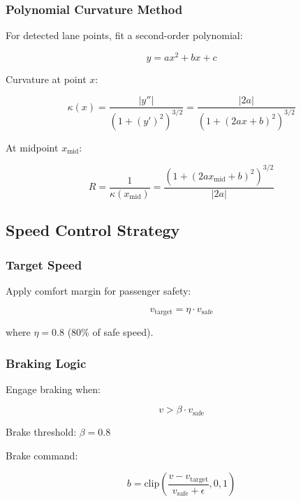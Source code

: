 \documentclass[11pt,a4paper]{article}
\begin{document}
\subsubsection{Polynomial Curvature Method}

For detected lane points, fit a second-order polynomial:

\begin{equation}
y = ax^2 + bx + c
\end{equation}

Curvature at point $x$:

\begin{equation}
\kappa(x) = \frac{|y''|}{(1 + (y')^2)^{3/2}} = \frac{|2a|}{(1 + (2ax + b)^2)^{3/2}}
\end{equation}

At midpoint $x_{\text{mid}}$:

\begin{equation}
R = \frac{1}{\kappa(x_{\text{mid}})} = \frac{(1 + (2ax_{\text{mid}} + b)^2)^{3/2}}{|2a|}
\end{equation}

\subsection{Speed Control Strategy}

\subsubsection{Target Speed}

Apply comfort margin for passenger safety:

\begin{equation}
v_{\text{target}} = \eta \cdot v_{\text{safe}}
\end{equation}

where $\eta = 0.8$ (80\% of safe speed).

\subsubsection{Braking Logic}

Engage braking when:

\begin{equation}
v > \beta \cdot v_{\text{safe}}
\end{equation}

Brake threshold: $\beta = 0.8$

Brake command:

\begin{equation}
b = \text{clip}\left(\frac{v - v_{\text{target}}}{v_{\text{safe}} + \epsilon}, 0, 1\right)
\end{equation}
\end{document}
